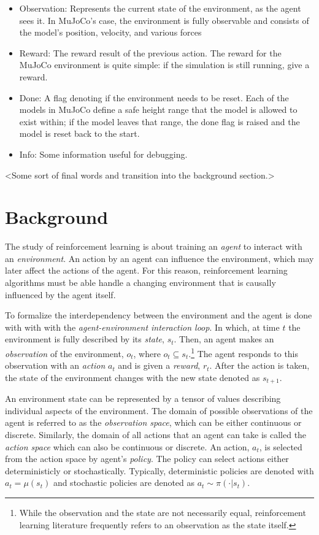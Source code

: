 \documentclass[conference]{IEEEtran}
\begin{document}
\begin{itemize}
    \item Observation: Represents the current state of the environment, as the agent sees it. In MuJoCo's case, the
    environment is fully observable and consists of the model's position, velocity, and various forces \cite{gym_source}
    \item Reward: The reward result of the previous action. The reward for the MuJoCo environment is quite simple: if
    the simulation is still running, give a reward.
    \item Done: A flag denoting if the environment needs to be reset. Each of the models in MuJoCo define a safe height
    range that the model is allowed to exist within; if the model leaves that range, the done flag is raised and the
    model is reset back to the start.
    \item Info: Some information useful for debugging.
\end{itemize}

<Some sort of final words and transition into the background section.>

\section{Background}

The study of reinforcement learning is about training an \textit{agent} to interact with an \textit{environment}. An action by an agent can influence the environment, which may later affect the actions of the agent. For this reason, reinforcement learning algorithms must be able handle a changing environment that is causally influenced by the agent itself.

To formalize the interdependency between the environment and the agent is done with with with the \textit{agent-environment interaction loop}. In which, at time $t$ the environment is fully described by its \textit{state}, $s_t$. Then, an agent makes an \textit{observation} of the environment, $o_t$, where $o_t \subseteq s_t$.\footnote{While the observation and the state are not necessarily equal, reinforcement learning literature frequently refers to an observation as the state itself.} The agent responds to this observation with an \textit{action} $a_t$ and is given a \textit{reward}, $r_t$. After the action is taken, the state of the environment changes with the new state denoted as $s_{t+1}$.

An environment state can be represented by a tensor of values describing individual aspects of the environment. The domain of possible observations of the agent is referred to as the \textit{observation space}, which can be either continuous or discrete. Similarly, the domain of all actions that an agent can take is called the \textit{action space} which can also be continuous or discrete. An action, $a_t$, is selected from the action space by agent's \textit{policy}. The policy can select actions either deterministicly or stochastically. Typically, deterministic policies are denoted with $a_t = \mu(s_t)$ and stochastic policies are denoted as $a_t \sim \pi(\cdot | s_t)$. \cite{spinning_up_intro}
\end{document}
